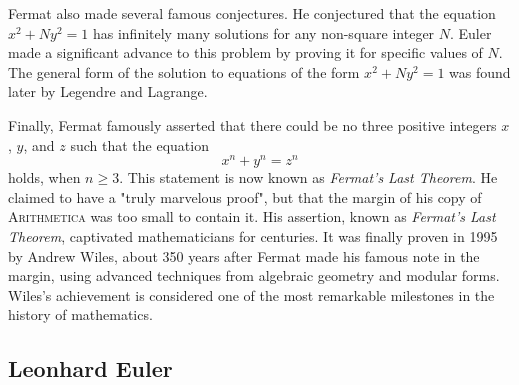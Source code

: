 Fermat also made several famous conjectures. He conjectured that the equation $x^2+Ny^2=1$ has infinitely many solutions for any non-square integer $N$. Euler made a significant advance to this problem by proving it for specific values of $N$. The general form of the solution to equations of the form $x^2+Ny^2=1$ was found later by Legendre and Lagrange.

Finally, Fermat famously asserted that there could be no three positive integers $x$, $y$, and $z$ such that the equation
\begin{equation*}
  x^n+y^n=z^n
\end{equation*}
holds, when $n\geq 3$. This statement is now known as \emph{Fermat's Last Theorem}. He claimed to have a "truly marvelous proof", but that the margin of his copy of \textsc{Arithmetica} was too small to contain it. His assertion, known as \emph{Fermat's Last Theorem}, captivated mathematicians for centuries. It was finally proven in 1995 by Andrew Wiles, about 350 years after Fermat made his famous note in the margin, using advanced techniques from algebraic geometry and modular forms. Wiles’s achievement is considered one of the most remarkable milestones in the history of mathematics.

\subsection{Leonhard Euler}

